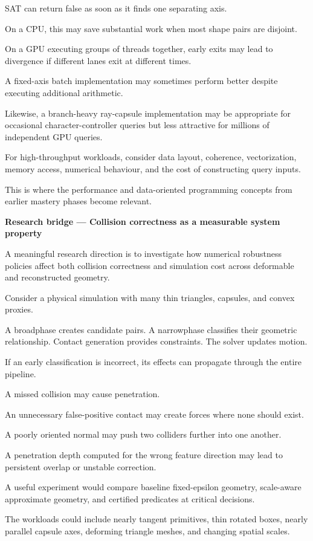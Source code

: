 SAT can return false as soon as it finds one separating axis.

On a CPU, this may save substantial work when most shape pairs are disjoint.

On a GPU executing groups of threads together, early exits may lead to divergence if different lanes exit at different times.

A fixed-axis batch implementation may sometimes perform better despite executing additional arithmetic.

Likewise, a branch-heavy ray-capsule implementation may be appropriate for occasional character-controller queries but less attractive for millions of independent GPU queries.

For high-throughput workloads, consider data layout, coherence, vectorization, memory access, numerical behaviour, and the cost of constructing query inputs.

This is where the performance and data-oriented programming concepts from earlier mastery phases become relevant.

\textbf{Research bridge --- Collision correctness as a measurable system property}

A meaningful research direction is to investigate how numerical robustness policies affect both collision correctness and simulation cost across deformable and reconstructed geometry.

Consider a physical simulation with many thin triangles, capsules, and convex proxies.

A broadphase creates candidate pairs. A narrowphase classifies their geometric relationship. Contact generation provides constraints. The solver updates motion.

If an early classification is incorrect, its effects can propagate through the entire pipeline.

A missed collision may cause penetration.

An unnecessary false-positive contact may create forces where none should exist.

A poorly oriented normal may push two colliders further into one another.

A penetration depth computed for the wrong feature direction may lead to persistent overlap or unstable correction.

A useful experiment would compare baseline fixed-epsilon geometry, scale-aware approximate geometry, and certified predicates at critical decisions.

The workloads could include nearly tangent primitives, thin rotated boxes, nearly parallel capsule axes, deforming triangle meshes, and changing spatial scales.

